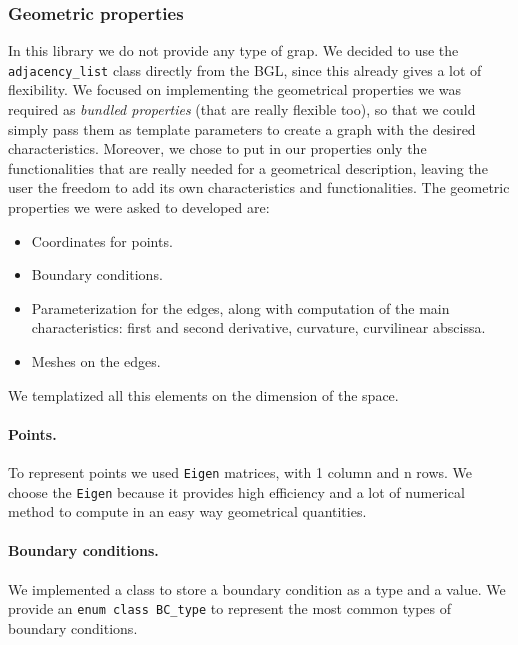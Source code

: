 \documentclass[11pt]{article} %
\newcommand{\classname}[1]{\texttt{#1}}
\begin{document}
	
		\subsubsection{Geometric properties}
		In this library we do not provide any type of grap. We decided to use the \classname{adjacency\_list} class directly from the BGL, since this already gives a lot of flexibility. We focused on implementing the geometrical properties we was required as \textit{bundled properties} (that are really flexible too), so that we could simply pass them as template parameters to create a graph with the desired characteristics. Moreover, we chose to put in our properties only the functionalities that are really needed for a geometrical description, leaving the user the freedom to add its own characteristics and functionalities. \newline
		The geometric properties we were asked to developed are:
		\begin{itemize}
			\item Coordinates for points.
			\item Boundary conditions.
			\item Parameterization for the edges, along with computation of the main characteristics: first and second derivative, curvature, curvilinear abscissa.
			\item Meshes on the edges.
		\end{itemize}
		We templatized all this elements on the dimension of the space.				
		\paragraph{Points.}	To represent points we used \texttt{Eigen} matrices, with 1 column and n rows. We choose the \texttt{Eigen} because it provides high efficiency and a lot of numerical method to compute in an easy way geometrical quantities.
		\paragraph{Boundary conditions.} We implemented a class to store a boundary condition as a type and a value. We provide an \texttt{enum class BC\_type} to represent the most common types of boundary conditions.
\end{document}
